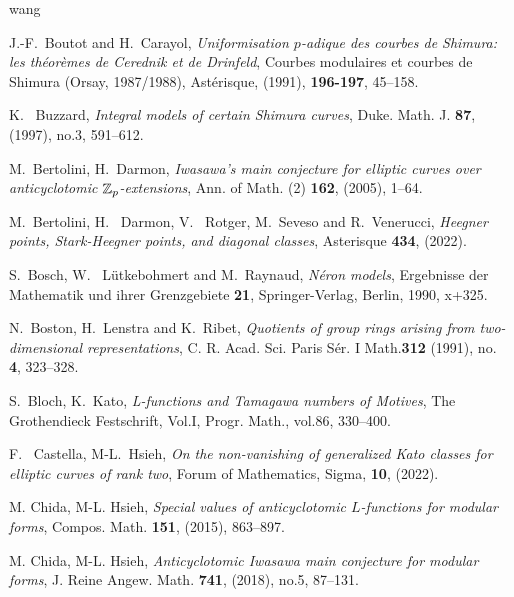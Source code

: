\documentclass[10pt]{amsart}
\numberwithin{equation}{section}
\theoremstyle{plain}
\numberwithin{equation}{section}
\theoremstyle{definition}
\theoremstyle{remark}
\begin{document}
\begin{thebibliography}{wang}

J.-F.~Boutot and  H.~Carayol,
 {\em Uniformisation {$p$}-adique des courbes de {S}himura: les
 th\'{e}or\`emes de {C}erednik et de {D}rinfeld}, Courbes modulaires et courbes de Shimura (Orsay, 1987/1988), Ast\'{e}risque, (1991), {\bf 196-197}, 45--158.

K.~ Buzzard, 
 {\em Integral models of certain Shimura curves}, Duke. Math. J. {\bf 87}, (1997), no.3, 591--612. 
 
M.~Bertolini, H.~Darmon,
{\em Iwasawa's main conjecture for elliptic curves over anticyclotomic {$\Bbb Z_p$}-extensions}, Ann. of Math. (2) {\bf 162}, (2005), 1--64. 

M.~Bertolini, H.~ Darmon, V.~ Rotger, M.~Seveso and R.~Venerucci, {\em Heegner points, Stark-Heegner points, and diagonal classes}, Asterisque  {\bf 434}, (2022).

S.~Bosch, W.~ L\"{u}tkebohmert and M.~Raynaud,
{\em N\'{e}ron models}, Ergebnisse der Mathematik und ihrer Grenzgebiete {\bf 21}, Springer-Verlag, Berlin, 1990, x+325. 

 N.~Boston,  H.~Lenstra and K.~Ribet, {\em Quotients of group rings arising from two-dimensional representations},
C. R. Acad. Sci. Paris S\'{e}r. I Math.{\bf 312} (1991), no. {\bf 4}, 323--328. 

 S.~Bloch, K.~Kato, {\em L-functions and Tamagawa numbers of Motives}, The Grothendieck Festschrift, Vol.I, Progr. Math., vol.86, 330--400.

              
F.~ Castella, M-L.~Hsieh,
{\em On the non-vanishing of generalized Kato classes for elliptic curves of rank two},  
Forum of Mathematics, Sigma, {\bf 10}, (2022).      
                          
M. Chida, M-L. Hsieh,
 {\em Special values of anticyclotomic {$L$}-functions for modular
              forms}, Compos. Math. {\bf 151}, (2015), 863--897.
              
M. Chida, M-L. Hsieh,
 {\em Anticyclotomic Iwasawa main conjecture for modular
         forms}, J. Reine Angew. Math. {\bf 741}, (2018), no.5, 87--131.
         
         

\end{thebibliography}
\end{document}
